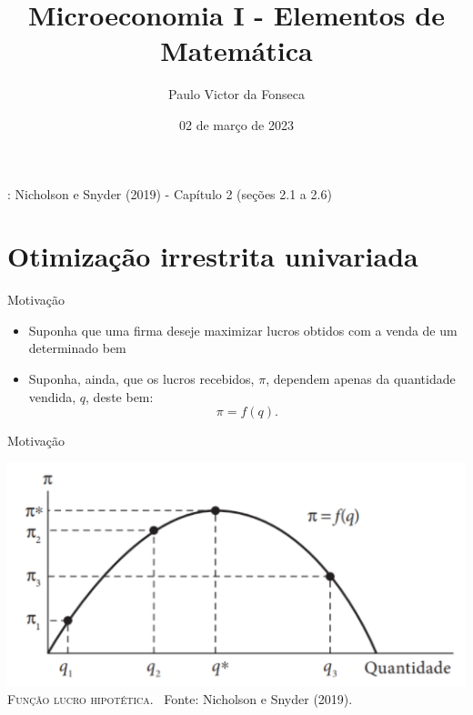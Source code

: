 \documentclass[10pt]{beamer}
\title[]{Microeconomia I - Elementos de Matemática}
\author[]{Paulo Victor da Fonseca}
\date{02 de março de 2023}
\begin{document}
\begin{frame}[plain]
\end{frame}

\begin{frame}
     \bigskip

    : Nicholson e Snyder (2019) - Capítulo 2 (seções 2.1 a 2.6)
\end{frame}

\section{Otimização irrestrita univariada}
\begin{frame}
    {Motivação}
    \begin{itemize}
        \item Suponha que uma firma deseje maximizar lucros obtidos com a venda de um determinado bem \bigskip
        \item Suponha, ainda, que os lucros recebidos, $\pi$, dependem apenas da quantidade vendida, $q$, deste bem:\medskip
        \begin{equation}
            \pi = f(q). \label{f_lucro}
        \end{equation}
    \end{itemize}
\end{frame}

\begin{frame}
    {Motivação}
    \begin{center}
		\begin{minipage}[b]{.8\textwidth}
			\includegraphics[width=\textwidth]{./figures/aula2_lucro.PNG}\\
			\tiny{{\scshape Função lucro hipotética}. \ Fonte: Nicholson e Snyder (2019).}
            \label{aula2_fig1}
		\end{minipage}
	\end{center}
\end{frame}
\end{document}
